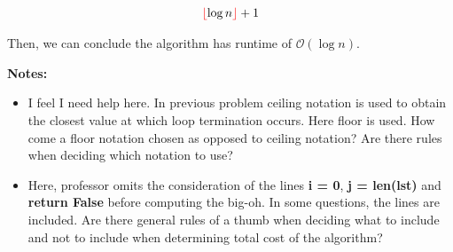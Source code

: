 \documentclass[12pt]{article}
\begin{document}
\begin{enumerate}[a.]
\begin{mdframed}
        \begin{align}
            \color{red}\lfloor\color{black} \log n \color{red}\rfloor\color{black} + 1
        \end{align}

        \bigskip

        Then, we can conclude the algorithm has runtime of \color{red}$\mathcal{O}(\log n)$\color{black}.

    \end{mdframed}

    \bigskip

    \textbf{Notes:}

    \begin{itemize}
        \item I feel I need help here. In previous problem ceiling notation is used to
        obtain the closest value at which loop termination occurs. Here floor is used.
        How come a floor notation chosen as opposed to ceiling notation? Are there
        rules when deciding which notation to use?

        \item Here, professor omits the consideration of the lines \textbf{i = 0},
        \textbf{j = len(lst)} and \textbf{return False} before computing the big-oh.
        In some questions, the lines are included. Are there general rules of a
        thumb when deciding what to include and not to include when determining
        total cost of the algorithm?

    \end{itemize}

\end{enumerate}
\end{document}
